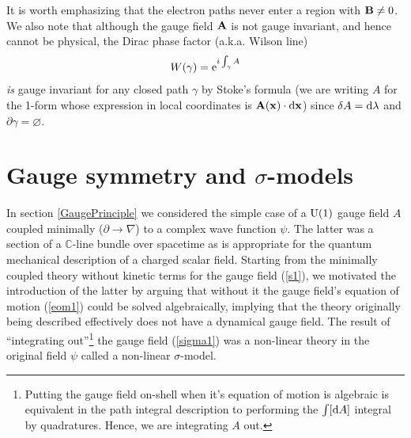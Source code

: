 \documentclass[12pt]{article}
\begin{document}
It is worth emphasizing that the electron paths never enter a region with ${\bf B}\neq 0$. We also note that although the gauge field ${\bf A}$ is not gauge invariant, and hence cannot be physical, the Dirac phase factor (a.k.a. Wilson line)
\begin{eqnarray}
W(\gamma)={\rm e}^{i \int_\gamma A}
\end{eqnarray}
{\em is} gauge invariant  for any closed path $\gamma$ by Stoke's formula (we are writing $A$ for the 1-form whose expression in local coordinates is ${\bf A}({\bf x}) \cdot {\rm d} {\bf x}$) since $\delta A={\rm d} \lambda$ and $\partial \gamma=\varnothing$. 




\section{Gauge symmetry and $\sigma$-models}

In section \ref{GaugePrinciple} we considered the simple case of a ${\rm U}(1)$ gauge field $A$ coupled minimally ($\partial\to \nabla$) to a complex wave function $\psi$. The latter was a section of a ${\mathbb C}$-line bundle over spacetime as is appropriate for the quantum mechanical description of a charged scalar field. Starting from the minimally coupled theory without kinetic terms for the gauge field (\ref{s1}), we motivated the introduction of the latter by arguing that without it the gauge field's equation of motion (\ref{eom1}) could be solved algebraically, implying that the theory originally being described effectively does not have a dynamical gauge field. The result of ``integrating out''\footnote{Putting the gauge field on-shell when it's equation of motion is algebraic is equivalent in the path integral description to performing the $\int [{\rm d}A]$ integral by quadratures. Hence, we are integrating $A$ out.} the gauge field (\ref{sigma1}) was a non-linear theory in the original field $\psi$ called a non-linear $\sigma$-model.
\end{document}
